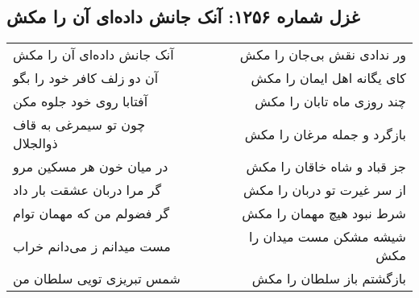 \begin{center}
\section*{غزل شماره ۱۲۵۶: آنک جانش داده‌ای آن را مکش}
\label{sec:1256}
\begin{longtable}{l p{0.5cm} r}
آنک جانش داده‌ای آن را مکش
&&
ور ندادی نقش بی‌جان را مکش
\\
آن دو زلف کافر خود را بگو
&&
کای یگانه اهل ایمان را مکش
\\
آفتابا روی خود جلوه مکن
&&
چند روزی ماه تابان را مکش
\\
چون تو سیمرغی به قاف ذوالجلال
&&
بازگرد و جمله مرغان را مکش
\\
در میان خون هر مسکین مرو
&&
جز قباد و شاه خاقان را مکش
\\
گر مرا دربان عشقت بار داد
&&
از سر غیرت تو دربان را مکش
\\
گر فضولم من که مهمان توام
&&
شرط نبود هیچ مهمان را مکش
\\
مست میدانم ز می‌دانم خراب
&&
شیشه مشکن مست میدان را مکش
\\
شمس تبریزی تویی سلطان من
&&
بازگشتم باز سلطان را مکش
\\
\end{longtable}
\end{center}
